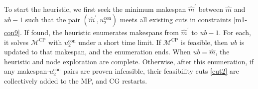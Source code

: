 \documentclass[12pt]{article}
\begin{document}


To start the heuristic, we first seek the minimum makespan $\widehat{m}^{\prime}$ between $\widehat{m}$ and $ub-1$ such that the pair $(\widehat{m}^{\prime},u^{\text{con}}_2)$ meets all existing cuts in constraints \eqref{m1-con9}. If found, the heuristic enumerates makespans from $\widehat{m}^{\prime}$ to $ub-1$. For each, it solves $\mathcal{M}^{\text{CP}}$ with $u^{\text{con}}_2$ under a short time limit. If $\mathcal{M}^{\text{CP}}$ is feasible, then $ub$ is updated to that makespan, and the enumeration ends. When $ub=\widehat{m}$, the heuristic and node exploration are complete. Otherwise, after this enumeration, %
if any makespan-$u^{\text{con}}_2$ pairs are proven infeasible, their feasibility cuts \eqref{cut2} are collectively added to the MP, and CG restarts.


\end{document}
